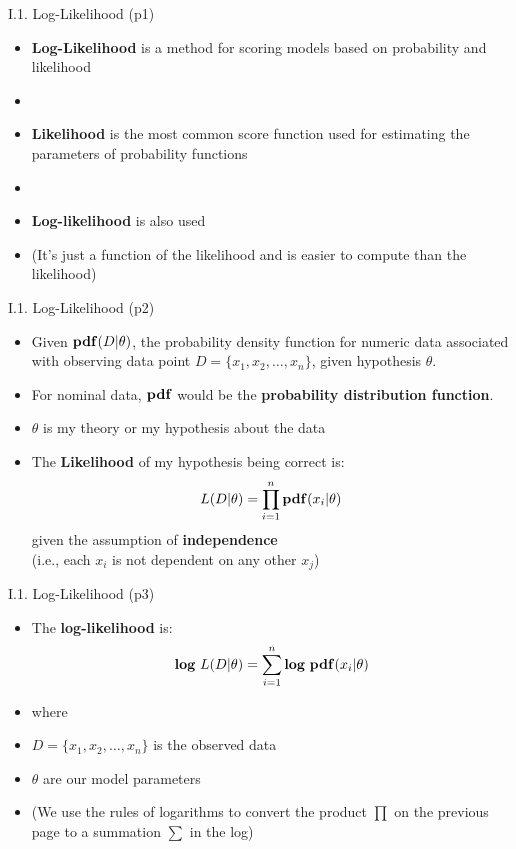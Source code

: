 \documentclass[handout]{beamer}
\newcommand{\strong}[1]{\textbf{\color{teal} #1}}
\newcommand{\stronger}[1]{\textbf{\color{purple} #1}}
\begin{document}
\begin{frame}{I.1. Log-Likelihood (p1)}
\begin{itemize}
\item[] \stronger{Log-Likelihood} is a method for scoring models based on probability and likelihood
\item[]
\item \strong{Likelihood} is the most common score function used for estimating the parameters of probability functions
\item[]
\item \strong{Log-likelihood} is also used
\item[] (It's just a function of the likelihood and is easier to compute than the likelihood)
\end{itemize}
\end{frame}
\begin{frame}{I.1. Log-Likelihood (p2)}
\begin{itemize}
\item Given ${\bf pdf}(D|\theta)$, 
the probability density function for numeric data associated with
observing data point $D = \{ x_1, x_2, \ldots, x_n \}$, given hypothesis $\theta$.
\item For nominal data, ${\bf pdf}$ would be the \textbf{probability distribution function}.
\item $\theta$ is my theory or my hypothesis about the data
\item The \stronger{Likelihood} of my hypothesis being correct is:
\[
	L(D|\theta) = \prod_{i=1}^{n}{\bf pdf }( x_i | \theta )
\]
given the assumption of \stronger{independence}\\
(i.e., each $x_i$ is not dependent on any other $x_j$)
\end{itemize}
\end{frame}
\begin{frame}{I.1. Log-Likelihood (p3)}
\begin{itemize}
\item The \stronger{log-likelihood} is:
\[
{\bf log} ~ L (D|\theta) = \sum_{i=1}^{n}{\bf log ~ pdf}( x_i | \theta )
\]
\item[] where
\item $D = \{ x_1, x_2, \ldots, x_n \}$ is the observed data
\item $\theta$ are our model parameters
\item[] (We use the rules of logarithms to convert the product $\prod$ on the previous page to a summation $\sum$ in the log)
\end{itemize}
\end{frame}
\end{document}
